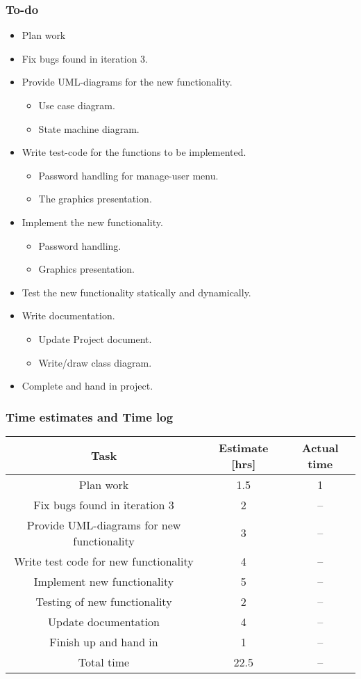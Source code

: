 \documentclass[12pt, letterpaper]{article}
\begin{document}
\subsubsection{To-do}
\begin{itemize}
	\item Plan work
	\item Fix bugs found in iteration 3.
	\item Provide UML-diagrams for the new functionality.
	\begin{itemize}
		\item Use case diagram.
		\item State machine diagram.
	\end{itemize}
	\item Write test-code for the functions to be implemented.
	\begin{itemize}
		\item Password handling for manage-user menu.
		\item The graphics presentation.
	\end{itemize}
	\item Implement the new functionality.
	\begin{itemize}
		\item Password handling.
		\item Graphics presentation.
	\end{itemize} 
	\item Test the new functionality statically and dynamically.
	\item Write documentation.
	\begin{itemize}
		\item Update Project document.
		\item Write/draw class diagram.
	\end{itemize}
	\item Complete and hand in project.
\end{itemize}
\subsubsection{Time estimates and Time log}
\begin{center}
	\begin{tabular}{|c|c|c|} 
		\hline
		Task & Estimate [hrs] & Actual time \\ [0.5ex] 
		\hline\hline
		Plan work & 1.5 & 1 \\ 
		\hline
		Fix bugs found in iteration 3 & 2 & --\\
		\hline 
		Provide UML-diagrams for new functionality & 3 & -- \\  
		\hline
		Write test code for new functionality & 4 & -- \\ 
		\hline
		Implement new functionality & 5 & -- \\ 
		\hline
		Testing of new functionality & 2 & -- \\ 
		\hline
		Update documentation & 4 & -- \\ 
		\hline
		Finish up and hand in & 1 & --\\ 
		\hline 
		Total time & 22.5 & --\\ [1ex]
		\hline
		
	\end{tabular}
\end{center}
\newpage
\end{document}
